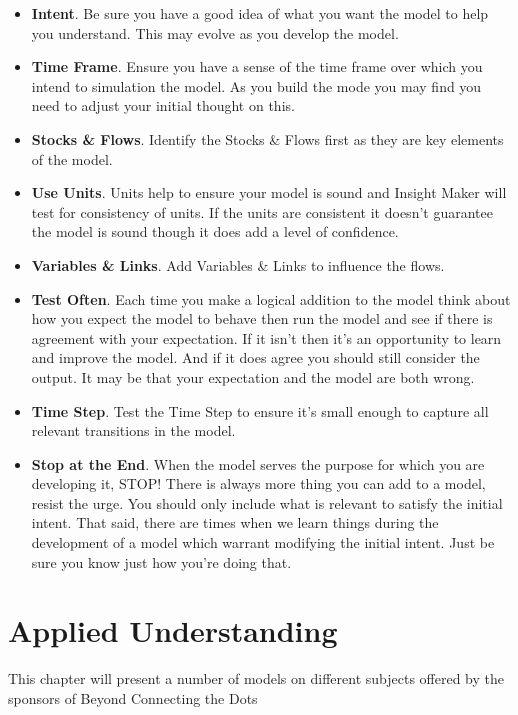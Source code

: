 \documentclass[]{memoir}
\begin{document}
\begin{itemize}
\itemsep1pt\parskip0pt
\item
  \textbf{Intent}. Be sure you have a good idea of what you want the
  model to help you understand. This may evolve as you develop the
  model.
\item
  \textbf{Time Frame}. Ensure you have a sense of the time frame over
  which you intend to simulation the model. As you build the mode you
  may find you need to adjust your initial thought on this.
\item
  \textbf{Stocks \& Flows}. Identify the Stocks \& Flows first as they
  are key elements of the model.
\item
  \textbf{Use Units}. Units help to ensure your model is sound and
  Insight Maker will test for consistency of units. If the units are
  consistent it doesn't guarantee the model is sound though it does add
  a level of confidence.
\item
  \textbf{Variables \& Links}. Add Variables \& Links to influence the
  flows.
\item
  \textbf{Test Often}. Each time you make a logical addition to the
  model think about how you expect the model to behave then run the
  model and see if there is agreement with your expectation. If it isn't
  then it's an opportunity to learn and improve the model. And if it
  does agree you should still consider the output. It may be that your
  expectation and the model are both wrong.
\item
  \textbf{Time Step}. Test the Time Step to ensure it's small enough to
  capture all relevant transitions in the model.
\item
  \textbf{Stop at the End}. When the model serves the purpose for which
  you are developing it, STOP! There is always more thing you can add to
  a model, resist the urge. You should only include what is relevant to
  satisfy the initial intent. That said, there are times when we learn
  things during the development of a model which warrant modifying the
  initial intent. Just be sure you know just how you're doing that.
\end{itemize}

\chapter{Applied Understanding}

This chapter will present a number of models on different subjects
offered by the sponsors of Beyond Connecting the Dots
\end{document}
